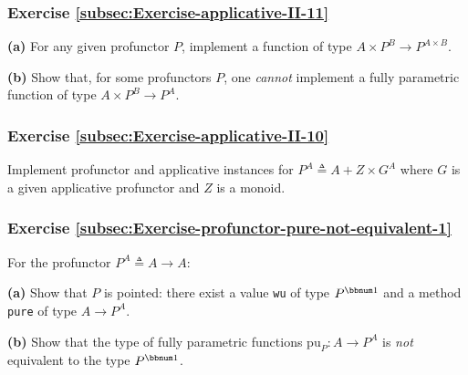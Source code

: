 \subsubsection{Exercise \label{subsec:Exercise-applicative-II-11}\ref{subsec:Exercise-applicative-II-11}}

\textbf{(a)} For any given profunctor $P$, implement a function of
type $A\times P^{B}\rightarrow P^{A\times B}$. 

\textbf{(b)} Show that, for some profunctors $P$, one \emph{cannot}
implement a fully parametric function of type $A\times P^{B}\rightarrow P^{A}$.

\subsubsection{Exercise \label{subsec:Exercise-applicative-II-10}\ref{subsec:Exercise-applicative-II-10}}

Implement profunctor and applicative instances for $P^{A}\triangleq A+Z\times G^{A}$
where $G$ is a given applicative profunctor and $Z$ is a monoid.

\subsubsection{Exercise \label{subsec:Exercise-profunctor-pure-not-equivalent-1}\ref{subsec:Exercise-profunctor-pure-not-equivalent-1}}

For the profunctor $P^{A}\triangleq A\rightarrow A$:

\textbf{(a)} Show that $P$ is pointed: there exist a value \lstinline!wu!
of type $P^{\bbnum 1}$ and a method \lstinline!pure! of type $A\rightarrow P^{A}$. 

\textbf{(b)} Show that the type of fully parametric functions $\text{pu}_{P}:A\rightarrow P^{A}$
is \emph{not} equivalent to the type $P^{\bbnum 1}$.

